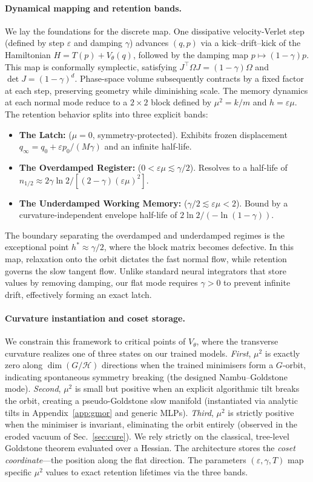 \documentclass{article}
\begin{document}
\paragraph{Dynamical mapping and retention bands.} We lay the foundations for the discrete map. One dissipative velocity-Verlet step (defined by step $\varepsilon$ and damping $\gamma$) advances $(q,p)$ via a kick--drift--kick of the Hamiltonian $H=T(p)+V_\theta(q)$, followed by the damping map $p\mapsto(1-\gamma)p$. This map is conformally symplectic, satisfying $J^\top\Omega J=(1-\gamma)\Omega$ and $\det J=(1-\gamma)^d$. Phase-space volume subsequently contracts by a fixed factor at each step, preserving geometry while diminishing scale. The memory dynamics at each normal mode reduce to a $2\times2$ block defined by $\mu^2=k/m$ and $h=\varepsilon\mu$. The retention behavior splits into three explicit bands:
\begin{itemize}
    \item \textbf{The Latch:} ($\mu=0$, symmetry-protected). Exhibits frozen displacement $q_\infty=q_0+\varepsilon p_0/(M\gamma)$ and an infinite half-life.
    \item \textbf{The Overdamped Register:} ($0<\varepsilon\mu\lesssim\gamma/2$). Resolves to a half-life of $n_{1/2}\approx2\gamma\ln2/[(2-\gamma)(\varepsilon\mu)^2]$.
    \item \textbf{The Underdamped Working Memory:} ($\gamma/2\lesssim\varepsilon\mu<2$). Bound by a curvature-independent envelope half-life of $2\ln2/(-\ln(1-\gamma))$.
\end{itemize}
The boundary separating the overdamped and underdamped regimes is the exceptional point $h^*\approx\gamma/2$, where the block matrix becomes defective. In this map, relaxation onto the orbit dictates the fast normal flow, while retention governs the slow tangent flow. Unlike standard neural integrators that store values by removing damping, our flat mode requires $\gamma>0$ to prevent infinite drift, effectively forming an exact latch.

\paragraph{Curvature instantiation and coset storage.} We constrain this framework to critical points of $V_\theta$, where the transverse curvature realizes one of three states on our trained models. \emph{First}, $\mu^2$ is exactly zero along $\dim(G/\mathcal H)$ directions when the trained minimisers form a $G$-orbit, indicating spontaneous symmetry breaking (the designed Nambu--Goldstone mode). \emph{Second}, $\mu^2$ is small but positive when an explicit algorithmic tilt breaks the orbit, creating a pseudo-Goldstone slow manifold (instantiated via analytic tilts in Appendix~\ref{app:gmor} and generic MLPs). \emph{Third}, $\mu^2$ is strictly positive when the minimiser is invariant, eliminating the orbit entirely (observed in the eroded vacuum of Sec.~\ref{sec:cure}). We rely strictly on the classical, tree-level Goldstone theorem evaluated over a Hessian. The architecture stores the \emph{coset coordinate}---the position along the flat direction. The parameters $(\varepsilon,\gamma,T)$ map specific $\mu^2$ values to exact retention lifetimes via the three bands.
\end{document}
